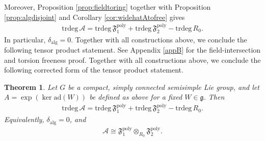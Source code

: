 \documentclass[11pt]{amsart}
\newtheorem{theorem}{Theorem}[section]
\theoremstyle{definition}
\theoremstyle{plain}
\theoremstyle{conclusion}
\begin{document}
Moreover, Proposition \ref{prop:fieldtoring} together with Proposition \ref{prop:algdisjoint} and Corollary \ref{cor:widehatAtofree} gives \begin{align*}
\mathrm{trdeg}\,\mathcal{A}=\mathrm{trdeg}\,\mathfrak{F}_1^{\mathrm{poly}}+\mathrm{trdeg}\,\mathfrak{F}_2^{\mathrm{poly}}-\mathrm{trdeg}\,R_0.
\end{align*} In particular, $\delta_{\mathrm{alg}}= 0$. Together with all constructions above, we conclude the following tensor product statement. See Appendix \ref{appB} for the field-intersection and torsion freeness proof. Together with all constructions above, we conclude the following corrected form of the tensor product statement. %



\begin{theorem}
\label{thm:tensorgeneric}
 Let $G$ be a compact, simply connected semisimple Lie group, and let $A=\exp(\ker\mathrm{ad}(W))$ be defined as above for a fixed $W \in \mathfrak{g}$. %
Then \begin{align*} \mathrm{trdeg}\,\mathcal{A}=\mathrm{trdeg}\,\mathfrak{F}_1^{\mathrm{poly}}+\mathrm{trdeg}\,\mathfrak{F}_2^{\mathrm{poly}}-\mathrm{trdeg}\,R_0 . \end{align*}
Equivalently, $\delta_{\mathrm{alg}}=0$, %
and\begin{align*}
\mathcal{A}\cong \mathfrak{F}_1^{\mathrm{poly}}\otimes_{R_0}\mathfrak{F}_2^{\mathrm{poly}} . 
\end{align*}
\end{theorem}  
\end{document}

